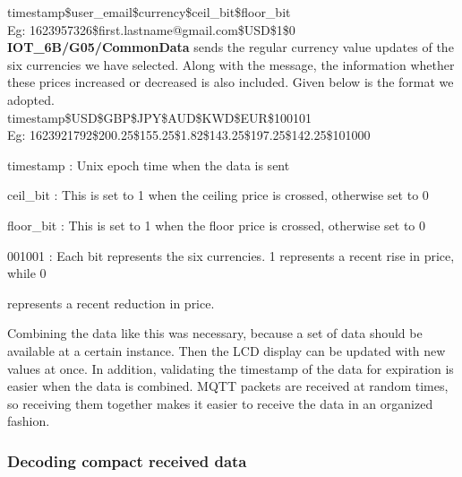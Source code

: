 timestamp\$user\_email\$currency\$ceil\_bit\$floor\_bit\\

Eg: 1623957326\$first.lastname@gmail.com\$USD\$1\$0\\


\textbf{IOT\_6B/G05/CommonData} sends the regular currency value updates of the six currencies we have selected. Along with the message, the information whether these prices increased or decreased is also included. Given below is the format we adopted.\\

timestamp\$USD\$GBP\$JPY\$AUD\$KWD\$EUR\$100101\\

Eg: 1623921792\$200.25\$155.25\$1.82\$143.25\$197.25\$142.25\$101000

\begin{flushleft}
{\selectfont
{}

\setlength{\itemindent}{0.1in}
\item timestamp 
      \tab
      :  Unix epoch time when the data is sent
\item ceil\_bit
      \tab
      :  This is set to 1 when the ceiling price is crossed, otherwise set to 0
 
\item floor\_bit
      \tab
      :  This is set to 1 when the floor price is crossed, otherwise set to 0

\item 001001
      \tab
      :  Each bit represents the six currencies. 1 represents a recent rise in price, while 0  
      
\item 
      \tab
          represents a recent reduction in price.
}

\end{flushleft}

Combining the data like this was necessary, because a set of data should be available at a certain instance. Then the LCD display can be updated with new values at once. In addition, validating the timestamp of the data for expiration is easier when the data is combined. MQTT packets are received at random times, so receiving them together makes it easier to receive the data in an organized fashion.

\subsubsection{Decoding compact received data}

